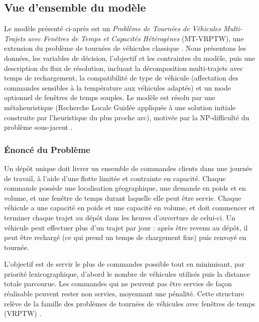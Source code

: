 \documentclass[12pt,a4paper]{report}
\begin{document}
\subsection{Vue d'ensemble du modèle}

Le modèle présenté ci-après est un \emph{Problème de Tournées de Véhicules Multi-Trajets avec Fenêtres de Temps et Capacités Hétérogènes} (MT-VRPTW), une extension du problème de tournées de véhicules classique \cite{dantzig1959,toth2014}. Nous présentons les données, les variables de décision, l'objectif et les contraintes du modèle, puis une description du flux de résolution, incluant la décomposition multi-trajets avec temps de rechargement, la compatibilité de type de véhicule (affectation des commandes sensibles à la température aux véhicules adaptés) et un mode optionnel de fenêtres de temps souples. Le modèle est résolu par une métaheuristique (Recherche Locale Guidée \cite{voudouris1999,voudouris1997} appliquée à une solution initiale construite par l'heuristique du plus proche arc), motivée par la NP-difficulté du problème sous-jacent \cite{lenstra1981,garey1979}.

\subsubsection{Énoncé du Problème}

Un dépôt unique doit livrer un ensemble de commandes clients dans une
journée de travail, à l'aide d'une flotte limitée et contrainte en
capacité. Chaque commande possède une localisation géographique, une
demande en poids et en volume, et une fenêtre de temps durant laquelle elle
peut être servie. Chaque véhicule a une capacité en poids et une capacité
en volume, et doit commencer et terminer chaque trajet au dépôt dans les
heures d'ouverture de celui-ci. Un véhicule peut effectuer plus d'un trajet
par jour : après être revenu au dépôt, il peut être rechargé (ce qui prend
un temps de chargement fixe) puis renvoyé en tournée.

L'objectif est de servir le plus de commandes possible tout en minimisant,
par priorité lexicographique, d'abord le nombre de véhicules utilisés puis
la distance totale parcourue. Les commandes qui ne peuvent pas être servies
de façon réalisable peuvent rester non servies, moyennant une pénalité.
Cette structure relève de la famille des problèmes de tournées de véhicules
avec fenêtres de temps (VRPTW) \cite{solomon1987,toth2014}.
\end{document}
